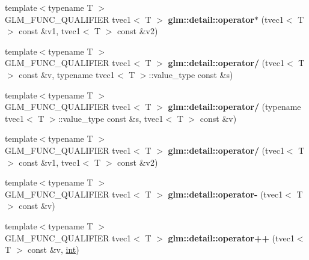 \begin{DoxyCompactItemize}
\item 
\hypertarget{namespaceglm_1_1detail_ad79aa7a83a2f742150cfa5c75bcbb5bb}{}{\footnotesize template$<$typename T $>$ }\\G\+L\+M\+\_\+\+F\+U\+N\+C\+\_\+\+Q\+U\+A\+L\+I\+F\+I\+E\+R tvec1$<$ T $>$ {\bfseries glm\+::detail\+::operator$\ast$} (tvec1$<$ T $>$ const \&v1, tvec1$<$ T $>$ const \&v2)\label{namespaceglm_1_1detail_ad79aa7a83a2f742150cfa5c75bcbb5bb}

\item 
\hypertarget{namespaceglm_1_1detail_ac91309d88faf4b29df645cd31148aee7}{}{\footnotesize template$<$typename T $>$ }\\G\+L\+M\+\_\+\+F\+U\+N\+C\+\_\+\+Q\+U\+A\+L\+I\+F\+I\+E\+R tvec1$<$ T $>$ {\bfseries glm\+::detail\+::operator/} (tvec1$<$ T $>$ const \&v, typename tvec1$<$ T $>$\+::value\+\_\+type const \&s)\label{namespaceglm_1_1detail_ac91309d88faf4b29df645cd31148aee7}

\item 
\hypertarget{namespaceglm_1_1detail_a21509cda8560c565139f8b835d9f66e0}{}{\footnotesize template$<$typename T $>$ }\\G\+L\+M\+\_\+\+F\+U\+N\+C\+\_\+\+Q\+U\+A\+L\+I\+F\+I\+E\+R tvec1$<$ T $>$ {\bfseries glm\+::detail\+::operator/} (typename tvec1$<$ T $>$\+::value\+\_\+type const \&s, tvec1$<$ T $>$ const \&v)\label{namespaceglm_1_1detail_a21509cda8560c565139f8b835d9f66e0}

\item 
\hypertarget{namespaceglm_1_1detail_aee9243f682c096dbae3ce672b811750f}{}{\footnotesize template$<$typename T $>$ }\\G\+L\+M\+\_\+\+F\+U\+N\+C\+\_\+\+Q\+U\+A\+L\+I\+F\+I\+E\+R tvec1$<$ T $>$ {\bfseries glm\+::detail\+::operator/} (tvec1$<$ T $>$ const \&v1, tvec1$<$ T $>$ const \&v2)\label{namespaceglm_1_1detail_aee9243f682c096dbae3ce672b811750f}

\item 
\hypertarget{namespaceglm_1_1detail_ac31957ab3e113b6049b68234fca9f67f}{}{\footnotesize template$<$typename T $>$ }\\G\+L\+M\+\_\+\+F\+U\+N\+C\+\_\+\+Q\+U\+A\+L\+I\+F\+I\+E\+R tvec1$<$ T $>$ {\bfseries glm\+::detail\+::operator-\/} (tvec1$<$ T $>$ const \&v)\label{namespaceglm_1_1detail_ac31957ab3e113b6049b68234fca9f67f}

\item 
\hypertarget{namespaceglm_1_1detail_a574ce6893275a07cba6d8bb7c65c09c7}{}{\footnotesize template$<$typename T $>$ }\\G\+L\+M\+\_\+\+F\+U\+N\+C\+\_\+\+Q\+U\+A\+L\+I\+F\+I\+E\+R tvec1$<$ T $>$ {\bfseries glm\+::detail\+::operator++} (tvec1$<$ T $>$ const \&v, \hyperlink{_s_d_l__thread_8h_a6a64f9be4433e4de6e2f2f548cf3c08e}{int})\label{namespaceglm_1_1detail_a574ce6893275a07cba6d8bb7c65c09c7}


\end{DoxyCompactItemize}
